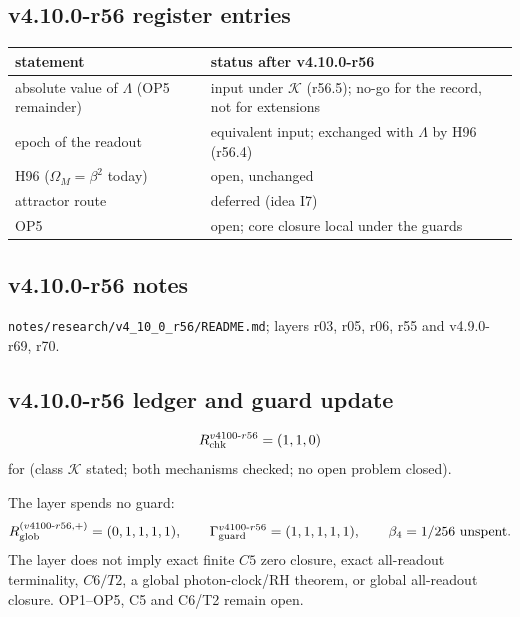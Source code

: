 \subsection*{v4.10.0-r56 register entries}
\label{subsec:v4100-r56-register}

\begin{center}
\small
\begin{tabular}{@{}>{\raggedright\arraybackslash}p{}>{\raggedright\arraybackslash}p{}@{}}
\toprule
statement & status after v4.10.0-r56\\
\midrule
absolute value of \(\Lambda\) (OP5 remainder) & input under \(\mathcal K\) (r56.5); no-go for the record, not for extensions\\
epoch of the readout & equivalent input; exchanged with \(\Lambda\) by H96 (r56.4)\\
H96 (\(\Omega_M=\beta^2\) today) & open, unchanged\\
attractor route & deferred (idea I7)\\
OP5 & open; core closure local under the guards\\
\bottomrule
\end{tabular}
\end{center}

\subsection*{v4.10.0-r56 notes}
\label{subsec:v4100-r56-notes}

\texttt{notes/\allowbreak research/\allowbreak v4\_10\_0\_r56/\allowbreak README.md}; layers r03, r05, r06, r55 and v4.9.0-r69, r70.

\subsection*{v4.10.0-r56 ledger and guard update}
\label{subsec:v4100-r56-ledger-guard}

\[
R_{\rm chk}^{v4100\text{-}r56}=(1,1,0)
\]
for (class \(\mathcal K\) stated; both mechanisms checked; no open problem closed).

The layer spends no guard:
\[
R_{\rm glob}^{(v4100\text{-}r56,+)}=(0,1,1,1,1),
\qquad
\Gamma_{\rm guard}^{v4100\text{-}r56}=(1,1,1,1,1),
\qquad
\beta_4=1/256\ \text{unspent}.
\]
The layer does not imply exact finite \(C5\) zero closure, exact all-readout terminality, \(C6/T2\), a global photon-clock/RH theorem,
or global all-readout closure.  OP1--OP5, C5 and C6/T2 remain open.

